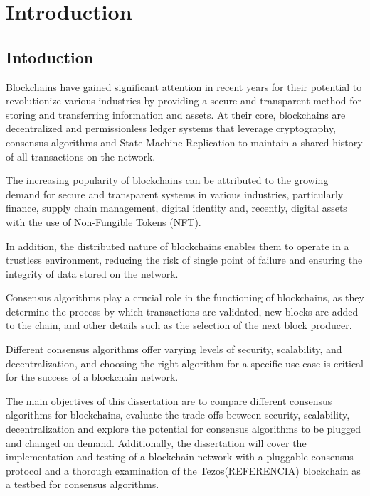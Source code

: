 \chapter{Introduction}
\label{chap:int}





\section{Intoduction}
Blockchains have gained significant attention in recent years for their potential to revolutionize various industries by providing a secure and transparent method for storing and transferring information and assets.
At their core, blockchains are decentralized and permissionless ledger systems that leverage cryptography, consensus algorithms and State Machine Replication to maintain a shared history of all transactions on the network.

The increasing popularity of blockchains can be attributed to the growing demand for secure and transparent systems in various industries, particularly finance, supply chain management, digital identity and, recently, digital assets with the use of Non-Fungible Tokens (NFT).

In addition, the distributed nature of blockchains enables them to operate in a trustless environment, reducing the risk of single point of failure and ensuring the integrity of data stored on the network.

Consensus algorithms play a crucial role in the functioning of blockchains, as they determine the process by which transactions are validated, new blocks are added to the chain, and other details such as the selection of the next block producer.

Different consensus algorithms offer varying levels of security, scalability, and decentralization, and choosing the right algorithm for a specific use case is critical for the success of a blockchain network.

The main objectives of this dissertation are to compare different consensus algorithms for blockchains,
evaluate the trade-offs between security, scalability, decentralization and explore the potential for consensus algorithms to be plugged and changed on demand.
Additionally, the dissertation will cover the implementation and testing of a blockchain network with a pluggable consensus protocol and a thorough examination of the Tezos(REFERENCIA) blockchain as a testbed for consensus algorithms.

